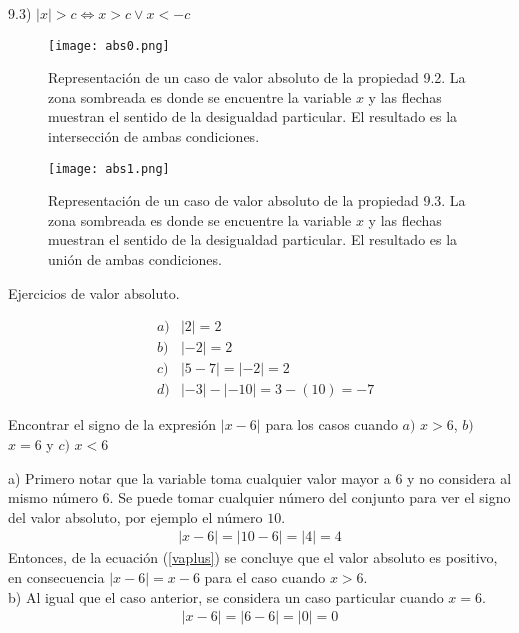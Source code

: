 9.3) $|x|>c\Leftrightarrow x>c \vee x<-c$
\begin{center}
	\begin{figure}[h!]
		\centering
		\texttt{[image: abs0.png]}
		\caption[Representación de un caso de valor absoluto de la propiedad 9.2]{Representación de un caso de valor absoluto de la propiedad 9.2. La zona sombreada es donde se encuentre la variable $x$ y las flechas muestran el sentido de la desigualdad particular. El resultado es la intersección de ambas condiciones.}
	\end{figure}
\end{center}
\begin{center}
	\begin{figure}[h!]
		\centering
		\texttt{[image: abs1.png]}
		\caption[Representación de un caso de valor absoluto de la propiedad 9.3]{Representación de un caso de valor absoluto de la propiedad 9.3. La zona sombreada es donde se encuentre la variable $x$ y las flechas muestran el sentido de la desigualdad particular. El resultado es la unión de ambas condiciones.}
	\end{figure}
\end{center}

\begin{myexample}
Ejercicios de valor absoluto.
\end{myexample}
\begin{eqnarray*}
&a)& |2|=2\\
&b)&|-2|=2\\
&c)&|5-7|=|-2|=2\\
&d)&|-3|-|-10|=3-(10)=-7
\end{eqnarray*}

\begin{myexample}
Encontrar el signo de la expresión $|x-6|$ para los casos cuando $a)$ $x>6$, $b)$ $x=6$ y $c)$ $x<6$
\end{myexample}
\noindent a) Primero notar que la variable toma cualquier valor mayor a $6$ y no considera al mismo número $6$. Se puede tomar cualquier número del conjunto para ver el signo del valor absoluto, por ejemplo el número $10$.\\
\begin{eqnarray}
|x-6|=|10-6|=|4|=4 \label{vaplus}
\end{eqnarray}
Entonces, de la ecuación (\ref{vaplus}) se concluye que el valor absoluto es positivo, en consecuencia $|x-6|=x-6$ para el caso cuando $x>6$.\\

\noindent b) Al igual que el caso anterior, se considera un caso particular cuando $x=6$.
\begin{eqnarray}
|x-6|=|6-6|=|0|=0
\end{eqnarray}

